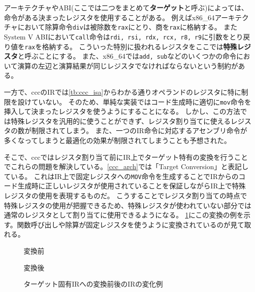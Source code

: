 \documentclass[../main.tex]{subfiles}
\begin{document}
アーキテクチャやABI(ここでは二つをまとめて\textbf{ターゲット}と呼ぶ)によっては、命令がある決まったレジスタを使用することがある。
例えばx86\_64アーキテクチャ\cite{guide2011intel}において除算命令\texttt{div}は被除数を\texttt{rax}にとり、商を\texttt{rax}に格納する。
またSystem V ABI\cite{SystemV}において\texttt{call}命令は\texttt{rdi, rsi, rdx, rcx, r8, r9}に引数をとり戻り値を\texttt{rax}を格納する。
こういった特別に扱われるレジスタをここでは\textbf{特殊レジスタ}と呼ぶことにする。
また、x86\_64では\texttt{add, sub}などのいくつかの命令において演算の左辺と演算結果が同じレジスタでなければならないという制約がある。

一方で、cccのIRでは\cref{tb:ccc_isa}からわかる通りオペランドのレジスタに特に制限を設けていない。
そのため、単純な実装ではコード生成時に適切に\texttt{mov}命令を挿入して決まったレジスタを使うようにすることになる。
しかし、この方法では特殊レジスタを汎用的に使うことができず、レジスタ割り当てに使えるレジスタの数が制限されてしまう。
また、一つのIR命令に対応するアセンブリ命令が多くなってしまうと最適化の効果が制限されてしまうことも予想された。

そこで、cccではレジスタ割り当て前にIR上でターゲット特有の変換を行うことでこれらの問題を解決している。\cref{ccc_arch}では「Target Conversion」と表記している。
これはIR上で固定レジスタへの\texttt{MOV}命令を生成することでIRからのコード生成時に正しいレジスタが使用されていることを保証しながらIR上で特殊レジスタの使用を表現するものだ。
こうすることでレジスタ割り当ての時点で特殊レジスタの使用が把握できるため、特殊レジスタが使われていない部分では通常のレジスタとして割り当てに使用できるようになる。
\cref{ccc_arch_fig}にこの変換の例を示す。関数呼び出しや除算が固定レジスタを使うように変換されているのが見て取れる。

\begin{figure}[h]
  \begin{minipage}{0.50\hsize}
    \centering
    
    \caption*{変換前}
  \end{minipage}
  \begin{minipage}{0.50\hsize}
    \centering
    
    \caption*{変換後}
  \end{minipage}
  \caption{ターゲット固有IRへの変換前後のIRの変化例}
  \label{ccc_arch_fig}
\end{figure}
\end{document}
